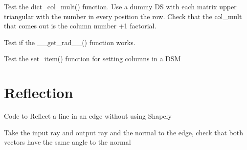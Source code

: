 \documentclass[letterpaper,10pt,english]{sphinxmanual}
\begin{document}

\begin{fulllineitems}
\label{index:DictionarySparseMatrix.test_20}
Test the dict\_col\_mult() function.
Use a dummy DS with each matrix upper triangular with the number in   every position the row.
Check that the col\_mult that comes out is the column number +1   factorial.

\end{fulllineitems}


\begin{fulllineitems}
\label{index:DictionarySparseMatrix.test_21}
Test if the \_\_get\_rad\_\_() function works.

\end{fulllineitems}


\begin{fulllineitems}
\label{index:DictionarySparseMatrix.test_22}
Test the set\_item() function for setting columns in a DSM

\end{fulllineitems}



\chapter{Reflection}
\label{index:reflection}\label{index:module-reflection}
Code to Reflect a line in an edge without using Shapely

\begin{fulllineitems}
\label{index:reflection.errorcheck}
Take the input ray and output ray and the normal to the edge,
check that both vectors have the same angle to the normal

\end{fulllineitems}

\end{document}
